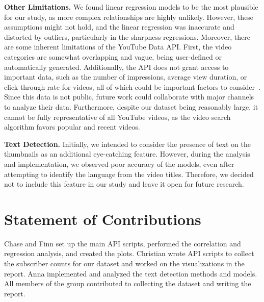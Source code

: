 \documentclass{article}
\begin{document}
\textbf{Other Limitations.} We found linear regression models to be the most plausible for our study, as more complex relationships are highly unlikely. However, these assumptions might not hold, and the linear regression was inaccurate and distorted by outliers, particularly in the sharpness regressions. Moreover, there are some inherent limitations of the YouTube Data API. First, the video categories are somewhat overlapping and vague, being user-defined or automatically generated. Additionally, the API does not grant access to important data, such as the number of impressions, average view duration, or click-through rate for videos, all of which could be important factors to consider~\cite{10youtubestats}. Since this data is not public, future work could collaborate with major channels to analyze their data. Furthermore, despite our dataset being reasonably large, it cannot be fully representative of all YouTube videos, as the video search algorithm favors popular and recent videos. 

\textbf{Text Detection.} Initially, we intended to consider the presence of text on the thumbnails as an additional eye-catching feature. However, during the analysis and implementation, we observed poor accuracy of the models, even after attempting to identify the language from the video titles. Therefore, we decided not to include this feature in our study and leave it open for future research.

\section{Statement of Contributions}
Chase and Finn set up the main API scripts, performed the correlation and regression analysis, and created the plots. Christian wrote API scripts to collect the subscriber counts for our dataset and worked on the visualizations in the report. Anna implemented and analyzed the text detection methods and models. All members of the group contributed to collecting the dataset and writing the report.

\vfill
\pagebreak


\end{document}
